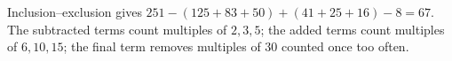 Inclusion--exclusion gives $251-(125+83+50)+(41+25+16)-8=\boxed{67}$. The subtracted terms count multiples of $2,3,5$; the added terms count multiples of $6,10,15$; the final term removes multiples of $30$ counted once too often.
